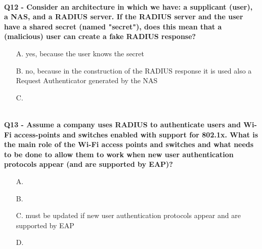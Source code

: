\textbf{\\Q12 - Consider an architecture in which we have: a supplicant (user), a NAS, and a RADIUS server. If the  RADIUS server and the user have a shared secret (named "secret"), does this mean that a (malicious) user can create
    a fake RADIUS response?}
\begin{itemize}
    \item[A.] yes, because the user knows the secret
    \item[B.] no, because in the construction of the RADIUS response it is used also a Request Authenticator generated by the NAS
    \item[C.] 
\end{itemize}

\textbf{\\Q13 - Assume a company uses RADIUS to authenticate users and Wi-Fi access-points and switches enabled with support for 802.1x. What is the main role of the Wi-Fi access points and switches and what needs to be done to allow them to
    work when new user authentication protocols appear (and are supported by EAP)?}
\begin{itemize}
    \item[A.] 
    \item[B.] 
    \item[C.] must be updated if new user authentication protocols appear and are supported by EAP
    \item[D.] 
\end{itemize}


